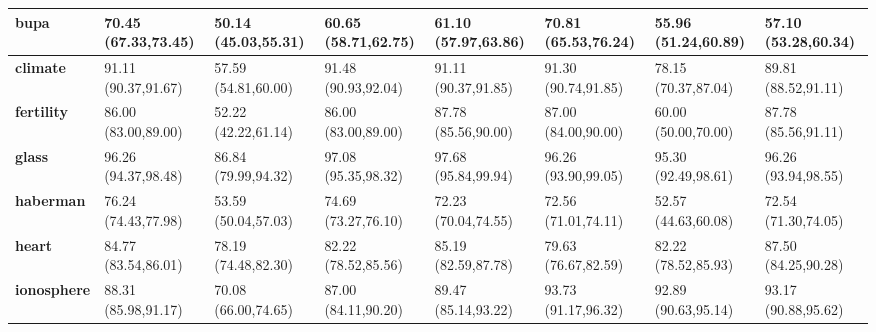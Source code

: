 \documentclass[conference]{IEEEtran}
\begin{document}
\begin{table*}[thpbh]
\begin{adjustbox}{width=1\textwidth}
\begin{tabular}{@{}cccccccc@{}}
			\multicolumn{1}{|l|}{\textbf{bupa}}         & \multicolumn{1}{l|}{70.45 (67.33,73.45)} & \multicolumn{1}{l|}{50.14 (45.03,55.31)} & \multicolumn{1}{l|}{60.65 (58.71,62.75)} & \multicolumn{1}{l|}{61.10 (57.97,63.86)}  & \multicolumn{1}{l|}{70.81 (65.53,76.24)}    & \multicolumn{1}{l|}{55.96 (51.24,60.89)}    & \multicolumn{1}{l|}{57.10 (53.28,60.34)}    \\ \midrule
			\multicolumn{1}{|l|}{\textbf{climate}}      & \multicolumn{1}{l|}{91.11 (90.37,91.67)} & \multicolumn{1}{l|}{57.59 (54.81,60.00)} & \multicolumn{1}{l|}{91.48 (90.93,92.04)} & \multicolumn{1}{l|}{91.11 (90.37,91.85)}  & \multicolumn{1}{l|}{91.30 (90.74,91.85)}    & \multicolumn{1}{l|}{78.15 (70.37,87.04)}    & \multicolumn{1}{l|}{89.81 (88.52,91.11)}    \\ \midrule
			\multicolumn{1}{|l|}{\textbf{fertility}}    & \multicolumn{1}{l|}{86.00 (83.00,89.00)} & \multicolumn{1}{l|}{52.22 (42.22,61.14)} & \multicolumn{1}{l|}{86.00 (83.00,89.00)} & \multicolumn{1}{l|}{87.78 (85.56,90.00)}  & \multicolumn{1}{l|}{87.00 (84.00,90.00)}    & \multicolumn{1}{l|}{60.00 (50.00,70.00)}    & \multicolumn{1}{l|}{87.78 (85.56,91.11)}    \\ \midrule
			\multicolumn{1}{|l|}{\textbf{glass}}        & \multicolumn{1}{l|}{96.26 (94.37,98.48)} & \multicolumn{1}{l|}{86.84 (79.99,94.32)} & \multicolumn{1}{l|}{97.08 (95.35,98.32)} & \multicolumn{1}{l|}{97.68 (95.84,99.94)}  & \multicolumn{1}{l|}{96.26 (93.90,99.05)}    & \multicolumn{1}{l|}{95.30 (92.49,98.61)}    & \multicolumn{1}{l|}{96.26 (93.94,98.55)}    \\ \midrule
			\multicolumn{1}{|l|}{\textbf{haberman}}     & \multicolumn{1}{l|}{76.24 (74.43,77.98)} & \multicolumn{1}{l|}{53.59 (50.04,57.03)} & \multicolumn{1}{l|}{74.69 (73.27,76.10)} & \multicolumn{1}{l|}{72.23 (70.04,74.55)}  & \multicolumn{1}{l|}{72.56 (71.01,74.11)}    & \multicolumn{1}{l|}{52.57 (44.63,60.08)}    & \multicolumn{1}{l|}{72.54 (71.30,74.05)}    \\ \midrule
			\multicolumn{1}{|l|}{\textbf{heart}}        & \multicolumn{1}{l|}{84.77 (83.54,86.01)} & \multicolumn{1}{l|}{78.19 (74.48,82.30)} & \multicolumn{1}{l|}{82.22 (78.52,85.56)} & \multicolumn{1}{l|}{85.19 (82.59,87.78)}  & \multicolumn{1}{l|}{79.63 (76.67,82.59)}    & \multicolumn{1}{l|}{82.22 (78.52,85.93)}    & \multicolumn{1}{l|}{87.50 (84.25,90.28)}    \\ \midrule
			\multicolumn{1}{|l|}{\textbf{ionosphere}}   & \multicolumn{1}{l|}{88.31 (85.98,91.17)} & \multicolumn{1}{l|}{70.08 (66.00,74.65)} & \multicolumn{1}{l|}{87.00 (84.11,90.20)} & \multicolumn{1}{l|}{89.47 (85.14,93.22)}  & \multicolumn{1}{l|}{93.73 (91.17,96.32)}    & \multicolumn{1}{l|}{92.89 (90.63,95.14)}    & \multicolumn{1}{l|}{93.17 (90.88,95.62)}    \\ \midrule

\end{tabular}
\end{adjustbox}
\end{table*}
\end{document}
